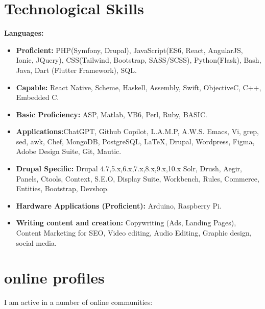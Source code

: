 \documentclass[]{friggeri-cv} %
\begin{document}
\section{Technological Skills}
\textbf{Languages:}
\begin{itemize}
\item \textbf{Proficient: }PHP(Symfony, Drupal), JavaScript(ES6, React, AngularJS, Ionic, JQuery), CSS(Tailwind, Bootstrap, SASS/SCSS), Python(Flask), Bash, Java, Dart (Flutter Framework), SQL.
\item \textbf{Capable: } React Native, Scheme, Haskell, Assembly, Swift, Objective\-C, C++, Embedded C.
\item \textbf{Basic Proficiency: }ASP, Matlab, VB6, Perl, Ruby, BASIC.
\item \textbf{Applications:}ChatGPT, Github Copilot, L.A.M.P, A.W.S. Emacs, Vi, grep, sed, awk, Chef, MongoDB, PostgreSQL, \LaTeX, Drupal, Wordpress, Figma, Adobe Design Suite, Git, Mautic.
\item \textbf{Drupal Specific: } Drupal 4.7,5.x,6.x,7.x,8.x,9.x,10.x Solr, Drush, Aegir, Panels, Ctools, Context, S.E.O, Display Suite, Workbench, Rules, Commerce, Entities, Bootstrap, Devshop.
\item \textbf{Hardware Applications (Proficient):} Arduino, Raspberry Pi.
\item \textbf{Writing content and creation:} Copywriting (Ads, Landing Pages), Content Marketing for SEO, Video editing, Audio Editing, Graphic design, social media.
\end{itemize}


\section{online profiles}
I am active in a number of online communities:
\end{document}
